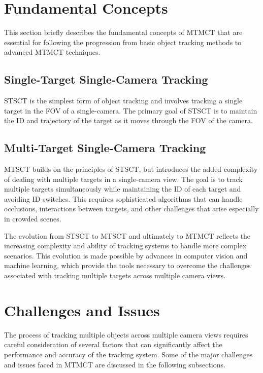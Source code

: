 \section{Fundamental Concepts}\label{sec:fundamental_concepts}
This section briefly describes the fundamental concepts of MTMCT that are essential for following the progression from basic object tracking methods to advanced MTMCT techniques.

\subsection{Single-Target Single-Camera Tracking}\label{subsec:st_sct}
STSCT is the simplest form of object tracking and involves tracking a single target in the FOV of a single-camera. The primary goal of STSCT is to maintain the ID and trajectory of the target as it moves through the FOV of the camera.

\subsection{Multi-Target Single-Camera Tracking}\label{subsec:mt_sct}
MTSCT builds on the principles of STSCT, but introduces the added complexity of dealing with multiple targets in a single-camera view. The goal is to track multiple targets simultaneously while maintaining the ID of each target and avoiding ID switches. This requires sophisticated algorithms that can handle occlusions, interactions between targets, and other challenges that arise especially in crowded scenes.

The evolution from STSCT to MTSCT and ultimately to MTMCT reflects the increasing complexity and ability of tracking systems to handle more complex scenarios. This evolution is made possible by advances in computer vision and machine learning, which provide the tools necessary to overcome the challenges associated with tracking multiple targets across multiple camera views.

\section{Challenges and Issues}\label{sec:challenges_and_issues}
The process of tracking multiple objects across multiple camera views requires careful consideration of several factors that can significantly affect the performance and accuracy of the tracking system. Some of the major challenges and issues faced in MTMCT are discussed in the following subsections.

